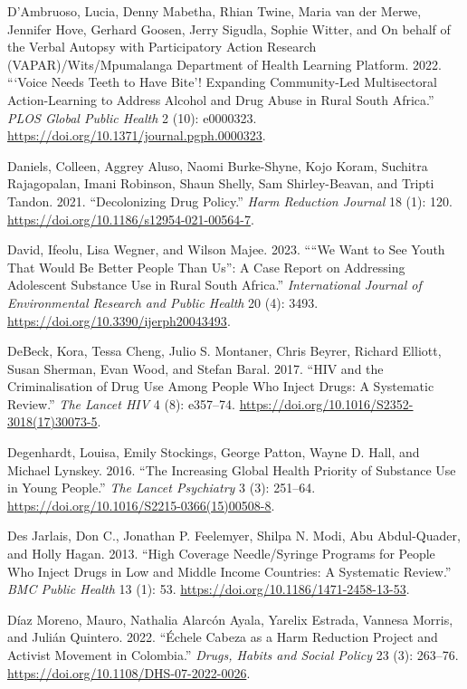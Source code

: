 \documentclass[
  letterpaper,
  DIV=11,
  numbers=noendperiod]{scrartcl}
\newlength{\cslhangindent}
\newenvironment{CSLReferences}[2] %
 {\begin{list}{}{%
  \setlength{\itemindent}{0pt}
  \setlength{\leftmargin}{0pt}
  \setlength{\parsep}{0pt}
  \ifodd #1
   \setlength{\leftmargin}{\cslhangindent}
   \setlength{\itemindent}{-1\cslhangindent}
  \fi
  \setlength{\itemsep}{#2\baselineskip}}}
 {\end{list}}
\begin{document}
\begin{CSLReferences}{1}{0}
D'Ambruoso, Lucia, Denny Mabetha, Rhian Twine, Maria van der Merwe,
Jennifer Hove, Gerhard Goosen, Jerry Sigudla, Sophie Witter, and On
behalf of the Verbal Autopsy with Participatory Action Research
(VAPAR)/Wits/Mpumalanga Department of Health Learning Platform. 2022.
{``{`}Voice Needs Teeth to Have Bite{'}! Expanding Community-Led
Multisectoral Action-Learning to Address Alcohol and Drug Abuse in Rural
South Africa.''} \emph{PLOS Global Public Health} 2 (10): e0000323.
\url{https://doi.org/10.1371/journal.pgph.0000323}.

Daniels, Colleen, Aggrey Aluso, Naomi Burke-Shyne, Kojo Koram, Suchitra
Rajagopalan, Imani Robinson, Shaun Shelly, Sam Shirley-Beavan, and
Tripti Tandon. 2021. {``Decolonizing Drug Policy.''} \emph{Harm
Reduction Journal} 18 (1): 120.
\url{https://doi.org/10.1186/s12954-021-00564-7}.

David, Ifeolu, Lisa Wegner, and Wilson Majee. 2023. {``{``}We Want to
See Youth That Would Be Better People Than Us{''}: A Case Report on
Addressing Adolescent Substance Use in Rural South Africa.''}
\emph{International Journal of Environmental Research and Public Health}
20 (4): 3493. \url{https://doi.org/10.3390/ijerph20043493}.

DeBeck, Kora, Tessa Cheng, Julio S. Montaner, Chris Beyrer, Richard
Elliott, Susan Sherman, Evan Wood, and Stefan Baral. 2017. {``HIV and
the Criminalisation of Drug Use Among People Who Inject Drugs: A
Systematic Review.''} \emph{The Lancet HIV} 4 (8): e357--74.
\url{https://doi.org/10.1016/S2352-3018(17)30073-5}.

Degenhardt, Louisa, Emily Stockings, George Patton, Wayne D. Hall, and
Michael Lynskey. 2016. {``The Increasing Global Health Priority of
Substance Use in Young People.''} \emph{The Lancet Psychiatry} 3 (3):
251--64. \url{https://doi.org/10.1016/S2215-0366(15)00508-8}.

Des Jarlais, Don C., Jonathan P. Feelemyer, Shilpa N. Modi, Abu
Abdul-Quader, and Holly Hagan. 2013. {``High Coverage Needle/Syringe
Programs for People Who Inject Drugs in Low and Middle Income Countries:
A Systematic Review.''} \emph{BMC Public Health} 13 (1): 53.
\url{https://doi.org/10.1186/1471-2458-13-53}.

Díaz Moreno, Mauro, Nathalia Alarcón Ayala, Yarelix Estrada, Vannesa
Morris, and Julián Quintero. 2022. {``Échele Cabeza as a Harm Reduction
Project and Activist Movement in Colombia.''} \emph{Drugs, Habits and
Social Policy} 23 (3): 263--76.
\url{https://doi.org/10.1108/DHS-07-2022-0026}.


\end{CSLReferences}
\end{document}
